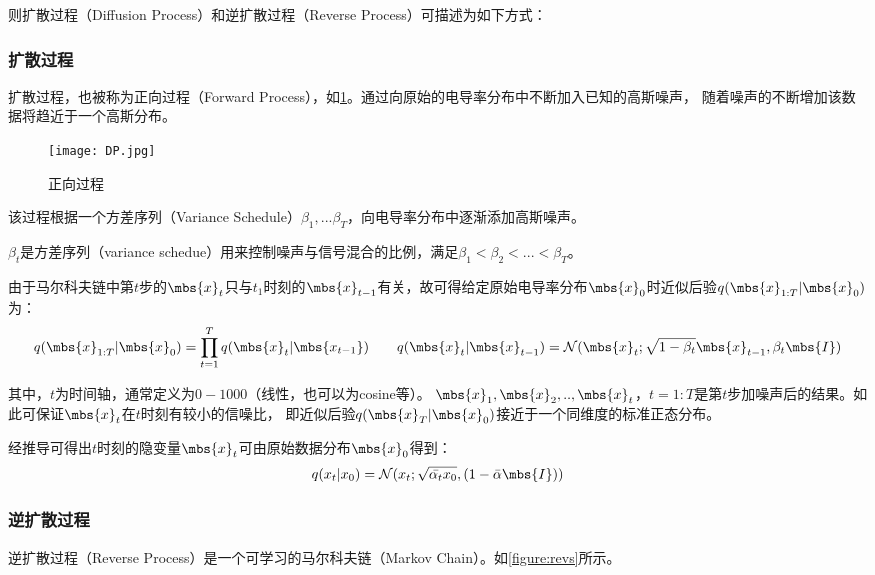 则扩散过程（Diffusion Process）和逆扩散过程（Reverse Process）可描述为如下方式：

\subsubsection{扩散过程}

扩散过程，也被称为正向过程（Forward Process），如\cref{figure:dp}。通过向原始的电导率分布中不断加入已知的高斯噪声，
随着噪声的不断增加该数据将趋近于一个高斯分布。

\begin{figure}[h]
    \centering
    \texttt{[image: DP.jpg]}
    \caption{正向过程}
    \label{figure:dp}
\end{figure}

该过程根据一个方差序列（Variance Schedule）$\beta_1, ...\beta_T$，向电导率分布中逐渐添加高斯噪声。

$\beta_t$是方差序列（variance schedue）用来控制噪声与信号混合的比例，满足$\beta_1 < \beta_2 <...<\beta_T$。

由于马尔科夫链中第$t$步的$\mbs{x}_{t}$只与$t_1$时刻的$\mbs{x}_{t-1}$有关，故可得给定原始电导率分布$\mbs{x}_0$时近似后验$q(\mbs{x}_{1:T}|\mbs{x}_0)$为：
\begin{equation}
    \centering
    q(\mbs{x}_{1:T}|\mbs{x}_0) = \prod_{t=1}^{T} q(\mbs{x}_{t}|\mbs{x_{t-1}}) \qquad
    q(\mbs{x}_{t}|\mbs{x}_{t-1}) = \mathcal{N}(\mbs{x}_{t}; \sqrt{1-\beta_t}\mbs{x}_{t-1}, \beta_t\mbs{I})
    \label{equation:ddpm_f}
  \end{equation}

其中，$t$为时间轴，通常定义为$0-1000$（线性，也可以为cosine等）。
$\mbs{x}_1, \mbs{x}_2,..,\mbs{x}_{t}$，$t=1:T$是第$t$步加噪声后的结果。如此可保证$\mbs{x}_{t}$在$t$时刻有较小的信噪比，
即近似后验$q(\mbs{x}_{T}|\mbs{x}_0)$接近于一个同维度的标准正态分布。

经推导可得出$t$时刻的隐变量$\mbs{x}_{t}$可由原始数据分布$\mbs{x}_0$得到：
\begin{equation}
  \centering
  q(x_t|x_0) = \mathcal{N}(x_t; \sqrt{\bar{\alpha_t}x_0}, (1-\bar{\alpha}\mbs{I}))
\end{equation}


\subsubsection{逆扩散过程}

逆扩散过程（Reverse Process）是一个可学习的马尔科夫链（Markov Chain）。如\cref{figure:revs}所示。

